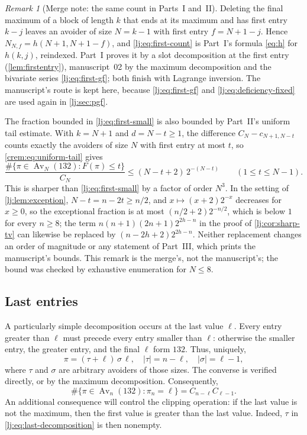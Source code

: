 \documentclass[11pt,a4paper]{article}
\theoremstyle{definition}\newaliascnt{definition}{theorem}
\theoremstyle{remark}\newaliascnt{remark}{theorem}
\newtheorem{remark}[remark]{Remark}
\newcommand{\Av}{\operatorname{Av}}
\begin{document}
\begin{remark}[Merge note: the same count in Parts~I and~II]
\label{lj:rem:first-entry}
Deleting the final maximum of a block of length $k$ that ends at its
maximum and has first entry $k-j$ leaves an avoider of size $N=k-1$ with
first entry $f=N+1-j$. Hence $N_{N,f}=h(N+1,N+1-f)$, and
\eqref{lj:eq:first-count} is Part~I's formula \eqref{eq:h} for $h(k,j)$,
reindexed. Part~I proves it by a slot decomposition at the first entry
(\cref{lem:firstentry}), manuscript~02 by the maximum decomposition and the
bivariate series \eqref{lj:eq:first-gf}; both finish with Lagrange
inversion. The manuscript's route is kept here, because
\eqref{lj:eq:first-gf} and \eqref{lj:eq:deficiency-fixed} are used again in
\cref{lj:sec:pgf}.

The fraction bounded in \eqref{lj:eq:first-small} is also bounded by
Part~II's uniform tail estimate. With $k=N+1$ and $d=N-t\ge1$, the
difference $C_N-c_{N+1,N-t}$ counts exactly the avoiders of size $N$ with
first entry at most $t$, so \eqref{crem:eq:uniform-tail} gives
\[
 \frac{\#\{\pi\in\Av_N(132):F(\pi)\le t\}}{C_N}\le(N-t+2)\,2^{-(N-t)}
 \qquad(1\le t\le N-1).
\]
This is sharper than \eqref{lj:eq:first-small} by a factor of order $N^3$.
In the setting of \cref{lj:lem:exception}, $N-t=n-2t\ge n/2$, and
$x\mapsto(x+2)2^{-x}$ decreases for $x\ge0$, so the exceptional fraction is
at most $(n/2+2)2^{-n/2}$, which is below $1$ for every $n\ge8$; the term
$n(n+1)(2n+1)2^{2h-n}$ in the proof of \cref{lj:cor:sharp-tv} can likewise
be replaced by $(n-2h+2)2^{2h-n}$. Neither replacement changes an order of
magnitude or any statement of Part~III, which prints the manuscript's
bounds. This remark is the merge's, not the manuscript's; the bound was
checked by exhaustive enumeration for $N\le8$.
\end{remark}

\subsection{Last entries}
A particularly simple decomposition occurs at the last value $\ell$.
Every entry greater than $\ell$ must precede every entry smaller than
$\ell$: otherwise the smaller entry, the greater entry, and the final
$\ell$ form $132$. Thus, uniquely,
\begin{equation}
 \pi=(\tau+\ell)\,\sigma\,\ell,
 \quad |\tau|=n-\ell,\quad |\sigma|=\ell-1,
 \label{lj:eq:last-decomposition}
\end{equation}
where $\tau$ and $\sigma$ are arbitrary avoiders of those sizes.
The converse is verified directly, or by the maximum decomposition.
Consequently,
\begin{equation}
 \#\{\pi\in\Av_n(132):\pi_n=\ell\}=C_{n-\ell}C_{\ell-1}.
 \label{lj:eq:last-count}
\end{equation}
An additional consequence will control the clipping operation:
if the last value is not the maximum, then the first value is greater
than the last value. Indeed, $\tau$ in \eqref{lj:eq:last-decomposition}
is then nonempty.
\end{document}
